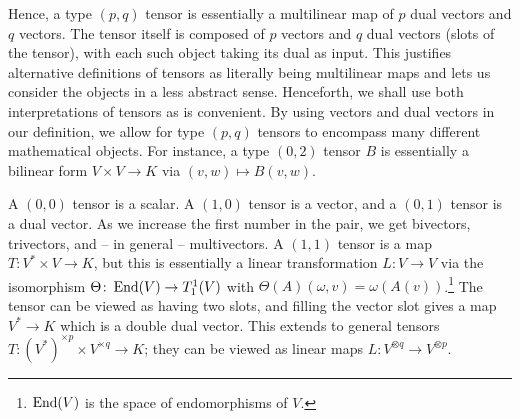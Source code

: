 \documentclass[a4paper,12pt]{article}
\begin{document}
Hence, a type $(p, q)$ tensor is essentially a multilinear map of $p$ dual vectors and $q$ vectors.
The tensor itself is composed of $p$ vectors and $q$ dual vectors (slots of the tensor), with each such object taking its dual as input.
This justifies alternative definitions of tensors as literally being multilinear maps and lets us consider the objects in a less abstract sense.
Henceforth, we shall use both interpretations of tensors as is convenient.
By using vectors and dual vectors in our definition, we allow for type $(p, q)$ tensors to encompass many different mathematical objects.
For instance, a type $(0, 2)$ tensor $B$ is essentially a bilinear form $V \times V \to K$ via $(v, w) \mapsto B(v, w)$.

A $(0, 0)$ tensor is a scalar.
A $(1, 0)$ tensor is a vector, and a $(0, 1)$ tensor is a dual vector.
As we increase the first number in the pair, we get bivectors, trivectors, and -- in general -- multivectors.
A $(1, 1)$ tensor is a map $T \colon V^* \times V \to K$, but this is essentially a linear transformation $L \colon V \to V$ via the isomorphism $\Theta \colon \operatorname{\mathrm{End}}(V) \to T^1_1(V)$ with $\Theta(A)(\omega, v) = \omega(A(v))$.\footnote{$\operatorname{\mathrm{End}}(V)$ is the space of endomorphisms of $V$.}
The tensor can be viewed as having two slots, and filling the vector slot gives a map $V^* \to K$ which is a double dual vector.
This extends to general tensors $T \colon (V^*)^{\times p} \times V^{\times q} \to K$; they can be viewed as linear maps $L \colon V^{\otimes q} \to V^{\otimes p}$.
\end{document}

